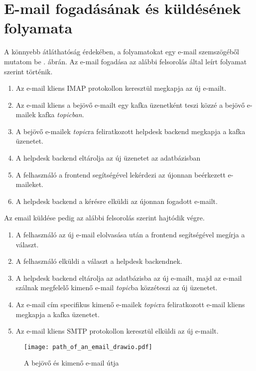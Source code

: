 \section{E-mail fogadásának és küldésének folyamata}
A könnyebb átláthatóság érdekében, a folyamatokat egy e-mail szemszögéből mutatom be . ábrán. Az e-mail fogadása az alábbi felsorolás által leírt folyamat szerint történik.
\begin{enumerate}
	\item Az e-mail kliens IMAP protokollon keresztül megkapja az új e-mailt.
	\item Az e-mail kliens a bejövő e-mailt egy kafka üzenetként teszi közzé a bejövő e-mailek kafka \emph{topicban}.
	\item A bejövő e-mailek \emph{topic}ra feliratkozott helpdesk backend megkapja a kafka üzenetet.
	\item A helpdesk backend eltárolja az új üzenetet az adatbázisban
	\item A felhasználó a frontend segítségével lekérdezi az újonnan beérkezett e-maileket.
	\item A helpdesk backend a kérésre elküldi az újonnan fogadott e-mailt.
\end{enumerate}

\bigskip
Az email küldése pedig az alábbi felsorolás szerint hajtódik végre.
\begin{enumerate}
	\item A felhasználó az új e-mail elolvasása után a frontend segítségével megírja a választ.
	\item A felhasználó elküldi a választ a helpdesk backendnek.
	\item A helpdesk backend eltárolja az adatbázisba az új e-mailt, majd az e-mail szálnak megfelelő kimenő e-mail \emph{topic}ba közzéteszi az új üzenetet.
	\item Az e-mail cím specifikus kimenő e-mailek \emph{topic}ra feliratkozott e-mail kliens megkapja a kafka üzenetet.
	\item Az e-mail kliens SMTP protokollon keresztül elküldi az új e-mailt.
\end{enumerate}


\begin{figure}[hbt] 
	\centering
	\texttt{[image: path\_of\_an\_email\_drawio.pdf]}
	\caption{A bejövő és kimenő e-mail útja}
	\label{fig:path_of_an_email}
\end{figure}
